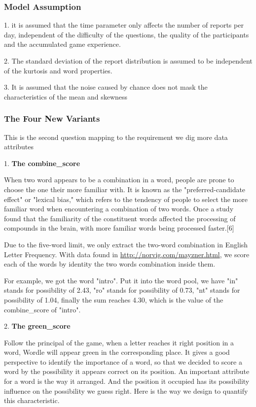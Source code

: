 \documentclass{mcmthesis}
\begin{document}
\subsubsection{Model Assumption}

\hspace*{0.6cm}1. it is assumed that the time parameter only affects the number of reports per day, independent of the difficulty of the questions, the quality of the participants and the accumulated game experience. 

2. The standard deviation of the report distribution is assumed to be independent of the kurtosis and word properties. 

3. It is assumed that the noise caused by chance does not mask the characteristics of the mean and skewness

\subsubsection{The Four New Variants}

\hspace*{0.6cm}This is the second question mapping to the requirement we dig more data attributes 

1. \textbf{The combine\_score} 

When two word appears to be a combination in a word, people are prone to choose the one their more familiar with. It is known as the "preferred-candidate effect" or "lexical bias," which refers to the tendency of people to select the more familiar word when encountering a combination of two words. Once a study found that the familiarity of the constituent words affected the processing of compounds in the brain, with more familiar words being processed faster.[6]

Due to the five-word limit, we only extract the two-word combination in English Letter Frequency. With data found in \url{http://norvig.com/mayzner.html}, we score each of the words by identity the two words combination inside them.

For example, we got the word "intro". Put it into the word pool, we have "in" stands for possibility of 2.43,  "ro" stands for possibility of 0.73, "nt" stands for possibility of 1.04, finally the sum reaches 4.30, which is the value of  the  combine\_score  of  "intro".

2. \textbf{The green\_score}

Follow the principal of the game, when a letter reaches it right position in a word, Wordle will appear green in the corresponding place. It gives a good perspective to identify the importance of a word, so that we decided to score a word by the possibility it appears correct on its position. An important attribute for a word is the way it arranged. And the position it occupied has its possibility influence on the possibility we guess right. Here is the way we design to quantify this characteristic.
\end{document}
